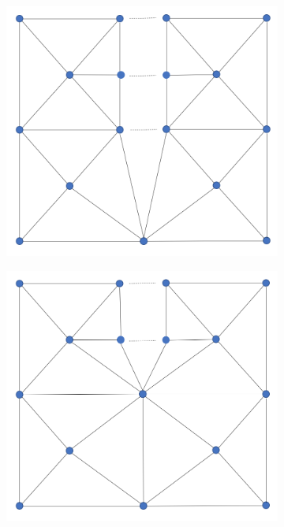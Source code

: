 \documentclass{article}
\begin{document}
\begin{figure}[H] \label{fig:submeshes_merge}
  \centering
  \begin{subfigure}[b]{0.2\linewidth}
    \includegraphics[width=\linewidth]{Fig_mesh_merge_01.png}
    \caption{}
  \end{subfigure}
  \begin{subfigure}[b]{0.2\linewidth}
    \includegraphics[width=\linewidth]{Fig_mesh_merge_02.png}

\end{subfigure}
\end{figure}
\end{document}
